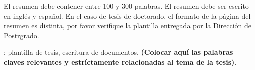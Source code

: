 El resumen debe contener entre 100 y 300 palabras. El resumen debe ser escrito en ingl\'es y espa\~nol.  En el caso de tesis de doctorado, el formato de la p\'agina del resumen es distinta, por favor verifique la plantilla entregada por la Direcci\'on de Postrgrado.\

\vfill
{}: plantilla de tesis, escritura de documentos, {\bf (Colocar aqu\'i las palabras claves relevantes y estr\'ictamente relacionadas al tema de la tesis)}.

